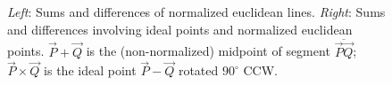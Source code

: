 \documentclass{birkjour}
\begin{document}
  \begin{figure}[b]
   \centering
{\setlength\fboxsep{0pt}\hspace{.1in}
{\setlength\fboxsep{0pt}}}%
\caption{\emph{Left}: Sums and differences of normalized euclidean lines.  \emph{Right}: Sums and differences involving ideal points and normalized euclidean points. $\vec{P}  + \vec{Q}$ is the (non-normalized) midpoint of segment $\overline{\vec{P}\vec{Q}}$; $\vec{P}\times\vec{Q}$ is the ideal point $\vec{P}-\vec{Q}$ rotated $90^\circ$ CCW.}
\label{fig:sumdiff}
\end{figure}

\end{document}
